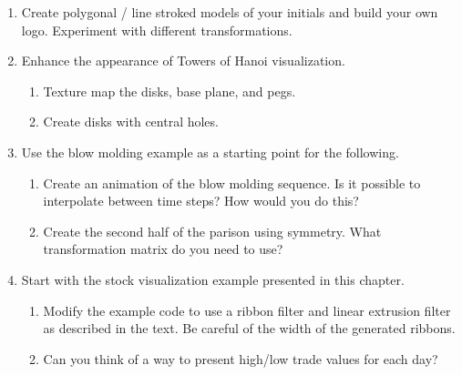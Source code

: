 \begin{enumerate}
    \item Create polygonal / line stroked models of your initials and build your own logo. Experiment with different transformations.

    \item Enhance the appearance of Towers of Hanoi visualization.
    \begin{enumerate}
        \item Texture map the disks, base plane, and pegs.
        \item Create disks with central holes.
    \end{enumerate}

    \item Use the blow molding example as a starting point for the
    following.
    \begin{enumerate}
        \item Create an animation of the blow molding sequence. Is it possible to interpolate between time steps? How would you do this?
        \item Create the second half of the parison using symmetry. What   transformation matrix do you need to use?
    \end{enumerate}

    \item Start with the stock visualization example presented in this chapter.
    \begin{enumerate}
        \item Modify the example code to use a ribbon filter and linear extrusion filter as described in the text. Be careful of the width of the   generated ribbons.
        \item Can you think of a way to present high/low trade values for each day?
    \end{enumerate}

\end{enumerate}
